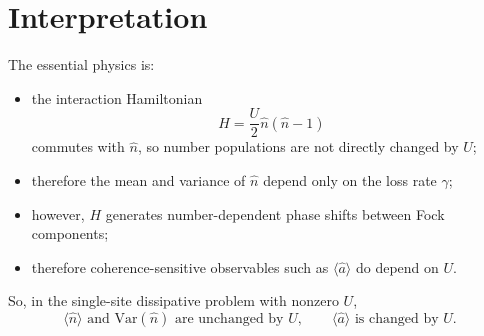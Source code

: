 \documentclass[12pt]{article}
\begin{document}
\section*{Interpretation}
The essential physics is:
\begin{itemize}
\item the interaction Hamiltonian
\[
H=\frac{U}{2}\hat n(\hat n-1)
\]
commutes with $\hat n$, so number populations are not directly changed by $U$;
\item therefore the mean and variance of $\hat n$ depend only on the loss rate $\gamma$;
\item however, $H$ generates number-dependent phase shifts between Fock components;
\item therefore coherence-sensitive observables such as $\langle \hat a\rangle$ do depend on $U$.
\end{itemize}

So, in the single-site dissipative problem with nonzero $U$,
\[
\boxed{
\langle \hat n\rangle \text{ and } \mathrm{Var}(\hat n) \text{ are unchanged by } U,
\qquad
\langle \hat a\rangle \text{ is changed by } U.
}
\]
\end{document}
